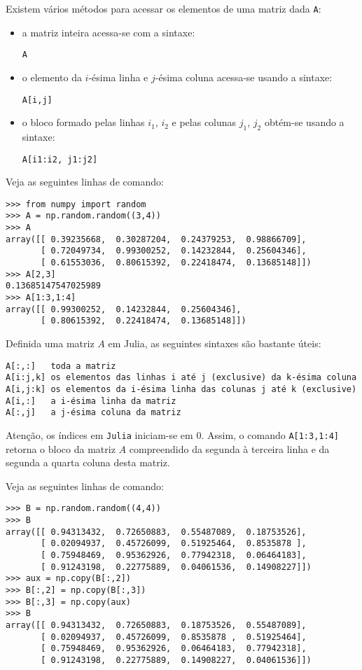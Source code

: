 Existem vários métodos para acessar os elementos de uma matriz dada \verb+A+:
\begin{itemize}
\item a matriz inteira acessa-se com a sintaxe:
\begin{lstlisting}
A
\end{lstlisting}
\item o elemento da $i$-ésima linha e $j$-ésima coluna acessa-se usando a sintaxe:
\begin{lstlisting}
A[i,j]
\end{lstlisting}
\item o bloco formado pelas linhas $i_1$, $i_2$ e pelas colunas $j_1$, $j_2$ obtém-se usando a sintaxe:
\begin{lstlisting}
A[i1:i2, j1:j2]
\end{lstlisting}
\end{itemize}

\begin{ex}
  Veja as seguintes linhas de comando:
\begin{lstlisting}
>>> from numpy import random
>>> A = np.random.random((3,4))
>>> A
array([[ 0.39235668,  0.30287204,  0.24379253,  0.98866709],
       [ 0.72049734,  0.99300252,  0.14232844,  0.25604346],
       [ 0.61553036,  0.80615392,  0.22418474,  0.13685148]])
>>> A[2,3]
0.13685147547025989
>>> A[1:3,1:4]
array([[ 0.99300252,  0.14232844,  0.25604346],
       [ 0.80615392,  0.22418474,  0.13685148]])
\end{lstlisting}
\end{ex}

Definida uma matriz $A$ em Julia, as seguintes sintaxes são bastante úteis:
\begin{lstlisting}
A[:,:]   toda a matriz
A[i:j,k] os elementos das linhas i até j (exclusive) da k-ésima coluna
A[i,j:k] os elementos da i-ésima linha das colunas j até k (exclusive)
A[i,:]   a i-ésima linha da matriz
A[:,j]   a j-ésima coluna da matriz
\end{lstlisting}

Atenção, os índices em \verb+Julia+ iniciam-se em $0$. Assim, o comando \verb+A[1:3,1:4]+ retorna o bloco da matriz $A$ compreendido da segunda à terceira linha e da segunda a quarta coluna desta matriz.

\begin{ex}
Veja as seguintes linhas de comando:
\begin{lstlisting}
>>> B = np.random.random((4,4))
>>> B
array([[ 0.94313432,  0.72650883,  0.55487089,  0.18753526],
       [ 0.02094937,  0.45726099,  0.51925464,  0.8535878 ],
       [ 0.75948469,  0.95362926,  0.77942318,  0.06464183],
       [ 0.91243198,  0.22775889,  0.04061536,  0.14908227]])
>>> aux = np.copy(B[:,2])
>>> B[:,2] = np.copy(B[:,3])
>>> B[:,3] = np.copy(aux)
>>> B
array([[ 0.94313432,  0.72650883,  0.18753526,  0.55487089],
       [ 0.02094937,  0.45726099,  0.8535878 ,  0.51925464],
       [ 0.75948469,  0.95362926,  0.06464183,  0.77942318],
       [ 0.91243198,  0.22775889,  0.14908227,  0.04061536]])
\end{lstlisting}
\end{ex}

